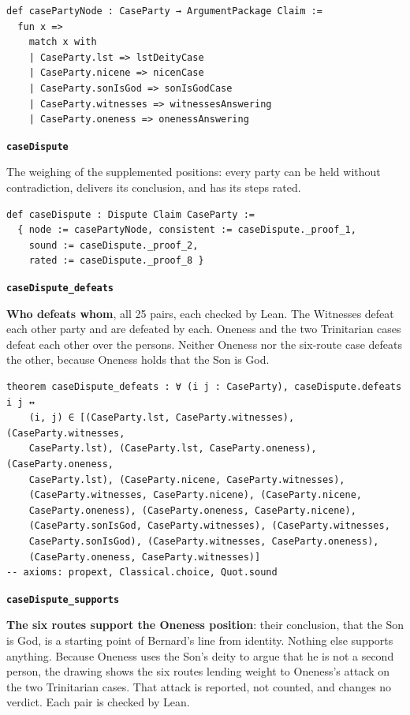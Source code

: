 \documentclass[11pt,paper=\testimonypaper,DIV=13,parskip=false]{scrartcl}
\begin{document}
{\small\begin{verbatim}
def casePartyNode : CaseParty → ArgumentPackage Claim :=
  fun x =>
    match x with
    | CaseParty.lst => lstDeityCase
    | CaseParty.nicene => nicenCase
    | CaseParty.sonIsGod => sonIsGodCase
    | CaseParty.witnesses => witnessesAnswering
    | CaseParty.oneness => onenessAnswering
\end{verbatim}}
\par\medskip\noindent\textbf{\texttt{case\allowbreak{}Dispute}}\par\nobreak\noindent
The weighing of the supplemented positions: every party can be held without contradiction, delivers its conclusion, and has its steps rated.

{\small\begin{verbatim}
def caseDispute : Dispute Claim CaseParty :=
  { node := casePartyNode, consistent := caseDispute._proof_1,
    sound := caseDispute._proof_2,
    rated := caseDispute._proof_8 }
\end{verbatim}}
\par\medskip\noindent\textbf{\texttt{case\allowbreak{}Dispute\_\allowbreak{}defeats}}\par\nobreak\noindent
\textbf{Who defeats whom}, all 25 pairs, each checked by Lean. The Witnesses defeat each other party and are defeated by each. Oneness and the two Trinitarian cases defeat each other over the persons. Neither Oneness nor the six-route case defeats the other, because Oneness holds that the Son is God.

{\small\begin{verbatim}
theorem caseDispute_defeats : ∀ (i j : CaseParty), caseDispute.defeats i j ↔
    (i, j) ∈ [(CaseParty.lst, CaseParty.witnesses), (CaseParty.witnesses,
    CaseParty.lst), (CaseParty.lst, CaseParty.oneness), (CaseParty.oneness,
    CaseParty.lst), (CaseParty.nicene, CaseParty.witnesses),
    (CaseParty.witnesses, CaseParty.nicene), (CaseParty.nicene,
    CaseParty.oneness), (CaseParty.oneness, CaseParty.nicene),
    (CaseParty.sonIsGod, CaseParty.witnesses), (CaseParty.witnesses,
    CaseParty.sonIsGod), (CaseParty.witnesses, CaseParty.oneness),
    (CaseParty.oneness, CaseParty.witnesses)]
-- axioms: propext, Classical.choice, Quot.sound
\end{verbatim}}
\par\medskip\noindent\textbf{\texttt{case\allowbreak{}Dispute\_\allowbreak{}supports}}\par\nobreak\noindent
\textbf{The six routes support the Oneness position}: their conclusion, that the Son is God, is a starting point of Bernard’s line from identity. Nothing else supports anything. Because Oneness uses the Son’s deity to argue that he is not a second person, the drawing shows the six routes lending weight to Oneness’s attack on the two Trinitarian cases. That attack is reported, not counted, and changes no verdict. Each pair is checked by Lean.
\end{document}
